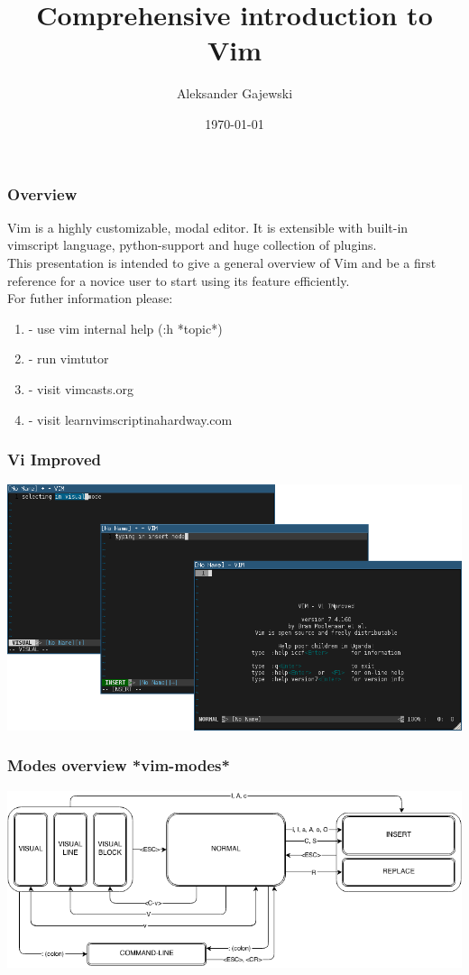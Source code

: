 \documentclass{beamer}
\title[Vim Intro]{Comprehensive introduction to Vim} %
\author{Aleksander Gajewski} %
\institute[None] %
{
\textit{aleksander@gajewski.fr} %
}
\date{\today} %
\begin{document}
\begin{frame}
\titlepage %
\end{frame}

\begin{frame}
  \frametitle{Overview}
  Vim is a highly customizable, modal editor. It is extensible with built-in vimscript language, python-support and huge collection of plugins.\\
  This presentation is intended to give a general overview of Vim and be a first reference for a novice user to start using its feature efficiently.\\
  For futher information please:
  \begin{enumerate} 
    \item - use vim internal help (:h *topic*)
    \item - run vimtutor
    \item - visit vimcasts.org
    \item - visit learnvimscriptinahardway.com
  \end{enumerate}
\end{frame}

\begin{frame}[fragile]
\frametitle{Vi Improved}
 \includegraphics[width=\textwidth]{vim_screen.png}
\end{frame}

\begin{frame}[fragile]
  \frametitle{Modes overview *vim-modes*}
  \includegraphics[width=\textwidth]{vim_modes.png}
\end{frame}
\end{document}
